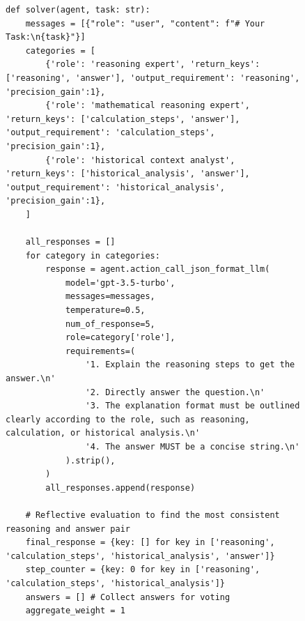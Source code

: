 \documentclass[11pt]{article}
\newcommand{\framework}{Gödel Agent\xspace}
\begin{document}
\begin{figure}[ht]
\begin{lstlisting}[style=pythonstyle, caption={Code of the best policy found by \framework for DROP.}]
def solver(agent, task: str):
    messages = [{"role": "user", "content": f"# Your Task:\n{task}"}]
    categories = [
        {'role': 'reasoning expert', 'return_keys': ['reasoning', 'answer'], 'output_requirement': 'reasoning', 'precision_gain':1},
        {'role': 'mathematical reasoning expert', 'return_keys': ['calculation_steps', 'answer'], 'output_requirement': 'calculation_steps', 'precision_gain':1},
        {'role': 'historical context analyst', 'return_keys': ['historical_analysis', 'answer'], 'output_requirement': 'historical_analysis', 'precision_gain':1},
    ]

    all_responses = []
    for category in categories:
        response = agent.action_call_json_format_llm(
            model='gpt-3.5-turbo', 
            messages=messages, 
            temperature=0.5, 
            num_of_response=5, 
            role=category['role'], 
            requirements=(
                '1. Explain the reasoning steps to get the answer.\n' 
                '2. Directly answer the question.\n' 
                '3. The explanation format must be outlined clearly according to the role, such as reasoning, calculation, or historical analysis.\n' 
                '4. The answer MUST be a concise string.\n'
            ).strip(),
        )
        all_responses.append(response)

    # Reflective evaluation to find the most consistent reasoning and answer pair
    final_response = {key: [] for key in ['reasoning', 'calculation_steps', 'historical_analysis', 'answer']}
    step_counter = {key: 0 for key in ['reasoning', 'calculation_steps', 'historical_analysis']}
    answers = [] # Collect answers for voting
    aggregate_weight = 1


\end{lstlisting}
\end{figure}
\end{document}
